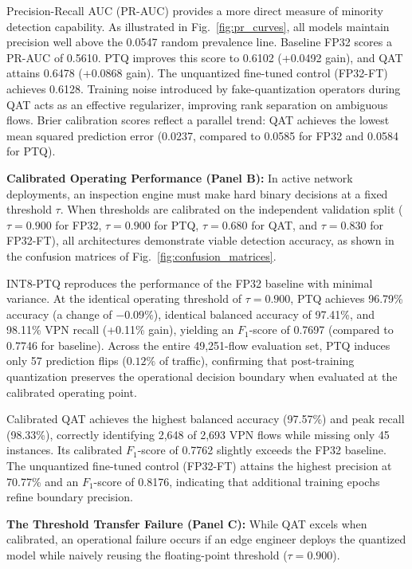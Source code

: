 \documentclass[conference]{IEEEtran}
\begin{document}
Precision-Recall AUC (PR-AUC) provides a more direct measure of minority detection capability. As illustrated in Fig.~\ref{fig:pr_curves}, all models maintain precision well above the 0.0547 random prevalence line. Baseline FP32 scores a PR-AUC of 0.5610. PTQ improves this score to 0.6102 (+0.0492 gain), and QAT attains 0.6478 (+0.0868 gain). The unquantized fine-tuned control (FP32-FT) achieves 0.6128. Training noise introduced by fake-quantization operators during QAT acts as an effective regularizer, improving rank separation on ambiguous flows. Brier calibration scores reflect a parallel trend: QAT achieves the lowest mean squared prediction error (0.0237, compared to 0.0585 for FP32 and 0.0584 for PTQ).

\textbf{Calibrated Operating Performance (Panel B):} In active network deployments, an inspection engine must make hard binary decisions at a fixed threshold $\tau$. When thresholds are calibrated on the independent validation split ($\tau = 0.900$ for FP32, $\tau = 0.900$ for PTQ, $\tau = 0.680$ for QAT, and $\tau = 0.830$ for FP32-FT), all architectures demonstrate viable detection accuracy, as shown in the confusion matrices of Fig.~\ref{fig:confusion_matrices}.

INT8-PTQ reproduces the performance of the FP32 baseline with minimal variance. At the identical operating threshold of $\tau = 0.900$, PTQ achieves 96.79\% accuracy (a change of $-0.09\%$), identical balanced accuracy of 97.41\%, and 98.11\% VPN recall (+0.11\% gain), yielding an $F_1$-score of 0.7697 (compared to 0.7746 for baseline). Across the entire 49,251-flow evaluation set, PTQ induces only 57 prediction flips ($0.12\%$ of traffic), confirming that post-training quantization preserves the operational decision boundary when evaluated at the calibrated operating point.

Calibrated QAT achieves the highest balanced accuracy (97.57\%) and peak recall (98.33\%), correctly identifying 2,648 of 2,693 VPN flows while missing only 45 instances. Its calibrated $F_1$-score of 0.7762 slightly exceeds the FP32 baseline. The unquantized fine-tuned control (FP32-FT) attains the highest precision at 70.77\% and an $F_1$-score of 0.8176, indicating that additional training epochs refine boundary precision.

\textbf{The Threshold Transfer Failure (Panel C):} While QAT excels when calibrated, an operational failure occurs if an edge engineer deploys the quantized model while naively reusing the floating-point threshold ($\tau = 0.900$). 
\end{document}
